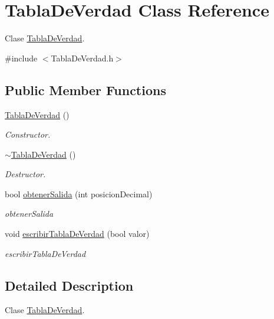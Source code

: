 \hypertarget{classTablaDeVerdad}{\section{Tabla\-De\-Verdad Class Reference}
\label{classTablaDeVerdad}
}


Clase \hyperlink{classTablaDeVerdad}{Tabla\-De\-Verdad}.  




{\ttfamily \#include $<$Tabla\-De\-Verdad.\-h$>$}

\subsection*{Public Member Functions}
\begin{DoxyCompactItemize}
\item 
\hyperlink{classTablaDeVerdad_a69d50b7f18461c771ceb15b14a660122}{Tabla\-De\-Verdad} ()
\begin{DoxyCompactList}\small\item\em Constructor. \end{DoxyCompactList}\item 
\hyperlink{classTablaDeVerdad_ac41dd0d65d191b0a34b369b8a4d2439d}{$\sim$\-Tabla\-De\-Verdad} ()
\begin{DoxyCompactList}\small\item\em Destructor. \end{DoxyCompactList}\item 
bool \hyperlink{classTablaDeVerdad_a3e53eabc4e37d9514141f4afacc1e915}{obtener\-Salida} (int posicion\-Decimal)
\begin{DoxyCompactList}\small\item\em obtener\-Salida \end{DoxyCompactList}\item 
void \hyperlink{classTablaDeVerdad_add681181eba54bcb2f1153c6f886a793}{escribir\-Tabla\-De\-Verdad} (bool valor)
\begin{DoxyCompactList}\small\item\em escribir\-Tabla\-De\-Verdad \end{DoxyCompactList}\end{DoxyCompactItemize}


\subsection{Detailed Description}
Clase \hyperlink{classTablaDeVerdad}{Tabla\-De\-Verdad}. 

